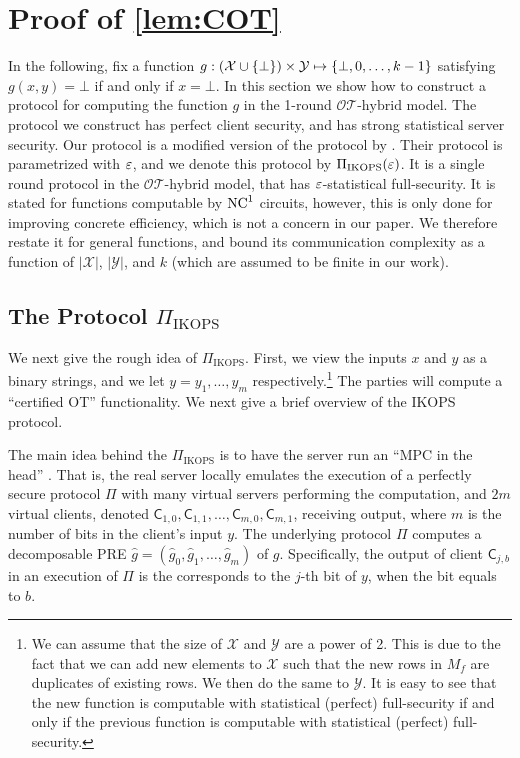 \documentclass{llncs}
\newcommand{\OTfunc}{\mathcal{OT}}
\newcommand{\OThybrid}{\OTfunc\mbox{-}\text{hybrid}}
\newcommand{\X}{\mathcal{X}}
\newcommand{\Y}{\mathcal{Y}}
\newcommand{\IKOPS}{\operatorname{IKOPS}}
\newcommand{\Cc}{\mathsf{C}}
\begin{document}
\section{Proof of \texorpdfstring{\cref{lem:COT}}{Lemma 3}}\label{sec:IKOPS}
In the following, fix a function $g:(\X\cup\set{\bot})\times\Y\mapsto\set{\bot,0,\ldots,k-1}$ satisfying $g(x,y)=\bot$ if and only if $x=\bot$. In this section we show how to construct a protocol for computing the function $g$ in the 1-round $\OThybrid$ model. The protocol we construct has perfect client security, and has strong statistical server security. Our protocol is a modified version of the protocol by \citet{IKOPS11}. Their protocol is parametrized with $\varepsilon$, and we denote this protocol by $\Pi_{\IKOPS}(\eps)$. It is a single round protocol in the $\OThybrid$ model, that has $\varepsilon$-statistical full-security. It is stated for functions computable by $\mathrm{NC}^1$ circuits, however, this is only done for improving concrete efficiency, which is not a concern in our paper. We therefore restate it for general functions, and bound its communication complexity as a function of $|\X|$, $|\Y|$, and $k$ (which are assumed to be finite in our work). 

\subsection{\texorpdfstring{The Protocol $\Pi_{\IKOPS}$}{The IKOPS Protocol}}
We next give the rough idea of $\Pi_{\IKOPS}$. First, we view the inputs $x$ and $y$ as a binary strings, and we let  $y=y_1,\ldots,y_m$ respectively.\footnote{We can assume \wlg that the size of $\X$ and $\Y$ are a power of 2. This is due to the fact that we can add new elements to $\X$ such that the new rows in $M_f$ are duplicates of existing rows. We then do the same to $\Y$. It is easy to see that the new function is computable with statistical (perfect) full-security if and only if the previous function is computable with statistical (perfect) full-security.} The parties will compute a ``certified OT'' functionality. We next give a brief overview of the IKOPS protocol. 

The main idea behind the $\Pi_{\IKOPS}$ is to have the server run an ``MPC in the head'' \cite{IPS08}. That is, the real server locally emulates the execution of a perfectly secure protocol $\Pi$ with many virtual servers performing the computation, and $2m$ virtual clients, denoted $\Cc_{1,0},\Cc_{1,1},\ldots,\Cc_{m,0},\Cc_{m,1}$, receiving output, where $m$ is the number of bits in the client's input $y$. The underlying protocol $\Pi$  computes a decomposable PRE $\hat{g} = (\hat{g}_0,\hat{g}_1,\ldots,\hat{g}_m)$ of $g$. Specifically, the output of client $\Cc_{j,b}$ in an execution of $\Pi$ is the  corresponds to the $j$-th bit of $y$, when the bit equals to $b$. 
\end{document}
